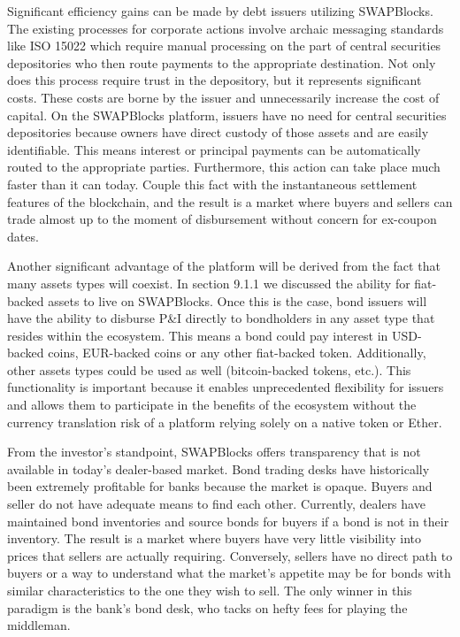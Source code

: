 \documentclass[12pt]{article}
\begin{document}
Significant efficiency gains can be made by debt issuers utilizing SWAPBlocks. The existing processes for 
corporate actions involve archaic messaging standards like ISO 15022 which require manual processing on the part of 
central securities depositories who then route payments to the appropriate destination. Not only does this process 
require trust in the depository, but it represents significant costs. These costs are borne by the issuer and 
unnecessarily increase the cost of capital. On the SWAPBlocks platform, issuers have no need for central securities depositories 
because owners have direct custody of those assets and are easily identifiable. This means interest or principal payments can be 
automatically routed to the appropriate parties. Furthermore, this action can take place much faster than it can today. Couple 
this fact with the instantaneous settlement features of the blockchain, and the result is a market where buyers 
and sellers can trade almost up to the moment of disbursement without concern for ex-coupon dates.

Another significant advantage of the platform will be derived from the fact that many assets types will coexist. In 
section 9.1.1 we discussed the ability for fiat-backed assets to live on SWAPBlocks. Once this is the case, bond 
issuers will have the ability to disburse P\&I directly to bondholders in any asset type that resides within the ecosystem. 
This means a bond could pay interest in USD-backed coins, EUR-backed coins or any other fiat-backed token. 
Additionally, other assets types could be used as well (bitcoin-backed tokens, etc.). This functionality is important 
because it enables unprecedented flexibility for issuers and allows them to participate in the benefits of the 
ecosystem without the currency translation risk of a platform relying solely on a native token or Ether.

From the investor’s standpoint, SWAPBlocks offers transparency that is not available in today’s dealer-based market. 
Bond trading desks have historically been extremely profitable for banks because the market is opaque. Buyers and 
seller do not have adequate means to find each other. Currently, dealers have maintained bond inventories and 
source bonds for buyers if a bond is not in their inventory. The result is a market where buyers have very little visibility 
into prices that sellers are actually requiring. Conversely, sellers have no direct path to buyers or a way to understand 
what the market’s appetite may be for bonds with similar characteristics to the one they wish to sell. The only 
winner in this paradigm is the bank’s bond desk, who tacks on hefty fees for playing the middleman. 
\end{document}
